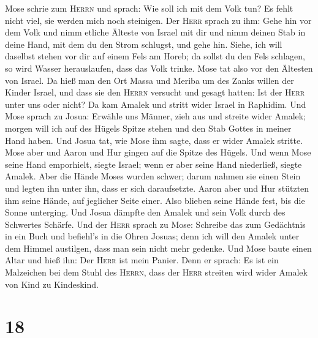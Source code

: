 Mose schrie zum \textsc{Herrn} und sprach: Wie soll ich
mit dem Volk tun? Es fehlt nicht viel, sie werden mich noch steinigen.
 Der \textsc{Herr} sprach zu ihm: Gehe hin vor dem Volk
und nimm etliche Älteste von Israel mit dir und nimm deinen Stab in
deine Hand, mit dem du den Strom schlugst, und gehe hin. 
Siehe, ich will daselbst stehen vor dir auf einem Fels am Horeb; da
sollst du den Fels schlagen, so wird Wasser herauslaufen, dass das Volk
trinke. Mose tat also vor den Ältesten von Israel.  Da
hieß man den Ort Massa und Meriba um des Zanks willen der Kinder Israel,
und dass sie den \textsc{Herrn} versucht und gesagt hatten: Ist der
\textsc{Herr} unter uns oder nicht?  Da kam Amalek und
stritt wider Israel in Raphidim.  Und Mose sprach zu
Josua: Erwähle uns Männer, zieh aus und streite wider Amalek; morgen
will ich auf des Hügels Spitze stehen und den Stab Gottes in meiner Hand
haben.  Und Josua tat, wie Mose ihm sagte, dass er wider
Amalek stritte. Mose aber und Aaron und Hur gingen auf die Spitze des
Hügels.  Und wenn Mose seine Hand emporhielt, siegte
Israel; wenn er aber seine Hand niederließ, siegte Amalek.
 Aber die Hände Moses wurden schwer; darum nahmen sie
einen Stein und legten ihn unter ihn, dass er sich daraufsetzte. Aaron
aber und Hur stützten ihm seine Hände, auf jeglicher Seite einer. Also
blieben seine Hände fest, bis die Sonne unterging.  Und
Josua dämpfte den Amalek und sein Volk durch des Schwertes Schärfe.
 Und der \textsc{Herr} sprach zu Mose: Schreibe das zum
Gedächtnis in ein Buch und befiehl's in die Ohren Josuas; denn ich will
den Amalek unter dem Himmel austilgen, dass man sein nicht mehr gedenke.
 Und Mose baute einen Altar und hieß ihn: Der
\textsc{Herr} ist mein Panier.  Denn er sprach: Es ist
ein Malzeichen bei dem Stuhl des \textsc{Herrn}, dass der \textsc{Herr}
streiten wird wider Amalek von Kind zu Kindeskind.

\hypertarget{section-17}{%
\section{18}\label{section-17}}

